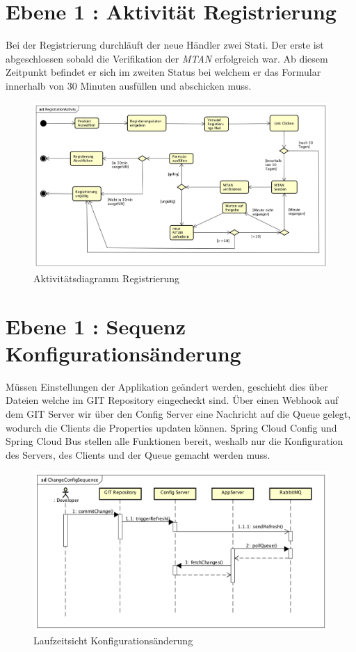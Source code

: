 \section{Ebene 1 : Aktivität Registrierung}
 
 Bei der Registrierung durchläuft der neue Händler zwei Stati. Der erste ist abgeschlossen sobald die Verifikation der \textit{\gls{MTAN}} erfolgreich war. Ab diesem Zeitpunkt befindet er sich im zweiten Status bei welchem er das Formular innerhalb von 30 Minuten ausfüllen und abschicken muss.	

\begin{figure}[H]
	\centering
	\includegraphics[scale=0.44]{RegistrationActivity.png}
	\caption{Aktivitätsdiagramm Registrierung}
\end{figure}
\newpage

\section{Ebene 1 : Sequenz Konfigurationsänderung}

Müssen Einstellungen der Applikation geändert werden, geschieht dies über Dateien welche im GIT Repository eingecheckt sind. Über einen Webhook auf dem GIT Server wir über den Config Server eine Nachricht auf die Queue gelegt, wodurch die Clients die Properties updaten können. Spring Cloud Config und Spring Cloud Bus stellen alle Funktionen bereit, weshalb nur die Konfiguration des Servers, des Clients und der Queue gemacht werden muss.
\begin{figure}[H]
	\centering
	\includegraphics[scale=0.6]{ChangeConfigSequence.png}
	\caption{Laufzeitsicht Konfigurationsänderung}
\end{figure}
\newpage

